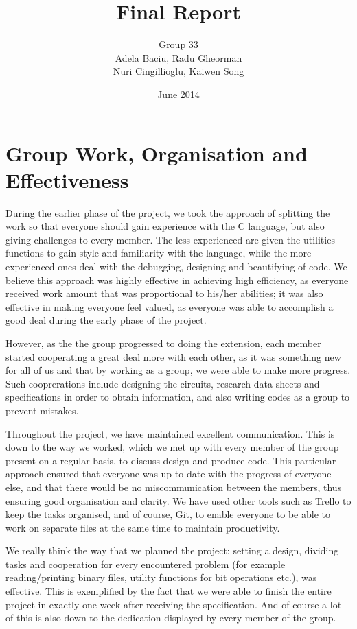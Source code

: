 \documentclass[11pt,a4paper]{article}
\title{Final Report}
\author{Group 33\\Adela Baciu, Radu Gheorman\\ Nuri Cingillioglu, Kaiwen Song}
\date{June 2014}
\begin{document}
\maketitle

\section{Group Work, Organisation and Effectiveness}
During the earlier phase of the project, we took the approach of splitting the work so that everyone should gain experience with the C language, but also giving challenges to every member. The less experienced are given the utilities functions to gain style and familiarity with the language, while the more experienced ones deal with the debugging, designing and beautifying of code. We believe this approach was highly effective in achieving high efficiency, as everyone received work amount that was proportional to his/her abilities; it was also effective in making everyone feel valued, as everyone was able to accomplish a good deal during the early phase of the project. 

However, as the the group progressed to doing the extension, each member started cooperating a great deal more with each other, as it was something new for all of us and that by working as a group, we were able to make more progress. Such cooprerations include designing the circuits, research data-sheets and specifications in order to obtain information, and also writing codes as a group to prevent mistakes.

Throughout the project, we have maintained excellent communication. This is down to the way we worked, which we met up with every member of the group present on a regular basis, to discuss design and produce code. This particular approach ensured that everyone was up to date with the progress of everyone else, and that there would be no miscommunication between the members, thus ensuring good organisation and clarity. We have used other tools such as Trello to keep the tasks organised, and of course, Git, to enable everyone to be able to work on separate files at the same time to maintain productivity.

We really think the way that we planned the project: setting a design, dividing tasks and cooperation for every encountered problem (for example reading/printing binary files, utility functions for bit operations etc.), was effective. This is exemplified by the fact that we were able to finish the entire project in exactly one week after receiving the specification. And of course a lot of this is also down to the dedication displayed by every member of the group.
\end{document}
